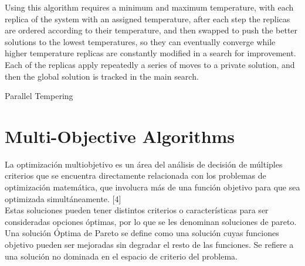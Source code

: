 Using this algorithm requires a minimum and maximum temperature, with each replica of the system with an assigned temperature, after each step the replicas are ordered according to their temperature, and then swapped to push the better solutions to the lowest temperatures, so they can eventually converge while higher temperature replicas are constantly modified in a search for improvement. Each of the replicas apply repeatedly a series of moves to a private solution, and then the global solution is tracked in the main search.
\begin{algorithm}[H]
\label{parallel_temp_alg}
\caption{Parallel Tempering}
\SetAlgoLined
{}
\end{algorithm}

\section{Multi-Objective Algorithms}

La optimización multiobjetivo es un área del análisis de decisión de múltiples criterios que se encuentra directamente relacionada con los problemas de optimización matemática, que involucra más de una función objetivo para que sea optimizada simultáneamente. [4] \\

Estas soluciones pueden tener distintos criterios o características para ser consideradas opciones óptimas, por lo que se les denominan soluciones de pareto. Una solución Óptima de Pareto se define como una solución cuyas funciones objetivo pueden ser mejoradas sin degradar el resto de las funciones. Se refiere a una solución no dominada en el espacio de criterio del problema. \\

